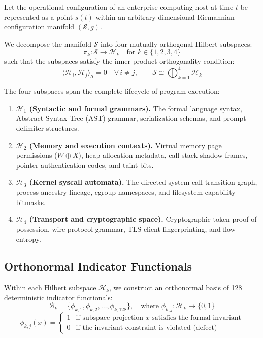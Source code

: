 \documentclass{portalciencia}
\theoremstyle{plain}
\theoremstyle{definition}
\begin{document}
Let the operational configuration of an enterprise computing host at time $t$ be represented as a point $s(t)$ within an arbitrary-dimensional Riemannian configuration manifold $(\mathcal{S}, g)$.

We decompose the manifold $\mathcal{S}$ into four mutually orthogonal Hilbert subspaces:
\begin{equation}
\label{eq:projection}
\pi_{k}: \mathcal{S} \to \mathcal{H}_{k} \quad \text{for } k \in \{1, 2, 3, 4\}
\end{equation}
such that the subspaces satisfy the inner product orthogonality condition:
\begin{equation}
\label{eq:orthogonality}
\langle \mathcal{H}_{i}, \mathcal{H}_{j} \rangle_{\mathcal{S}} = 0 \quad \forall\, i \ne j, \qquad \mathcal{S} \cong \bigoplus_{k=1}^{4} \mathcal{H}_{k}
\end{equation}

The four subspaces span the complete lifecycle of program execution:
\begin{enumerate}
  \item \textbf{$\mathcal{H}_1$ (Syntactic and formal grammars).} The formal language syntax, Abstract Syntax Tree (AST) grammar, serialization schemas, and prompt delimiter structures.
  \item \textbf{$\mathcal{H}_2$ (Memory and execution contexts).} Virtual memory page permissions ($W \oplus X$), heap allocation metadata, call-stack shadow frames, pointer authentication codes, and taint bits.
  \item \textbf{$\mathcal{H}_3$ (Kernel syscall automata).} The directed system-call transition graph, process ancestry lineage, cgroup namespaces, and filesystem capability bitmasks.
  \item \textbf{$\mathcal{H}_4$ (Transport and cryptographic space).} Cryptographic token proof-of-possession, wire protocol grammar, TLS client fingerprinting, and flow entropy.
\end{enumerate}

\subsection{Orthonormal Indicator Functionals}

Within each Hilbert subspace $\mathcal{H}_{k}$, we construct an orthonormal basis of 128 deterministic indicator functionals:
\begin{equation}
\label{eq:basis}
\mathcal{B}_{k} = \{ \phi_{k,1}, \phi_{k,2}, \dots, \phi_{k,128} \}, \quad \text{where } \phi_{k,j}: \mathcal{H}_{k} \to \{0, 1\}
\end{equation}
\begin{equation}
\label{eq:indicator}
\phi_{k,j}(x) = \begin{cases}
1 & \text{if subspace projection } x \text{ satisfies the formal invariant} \\
0 & \text{if the invariant constraint is violated (defect)}
\end{cases}
\end{equation}
\end{document}
